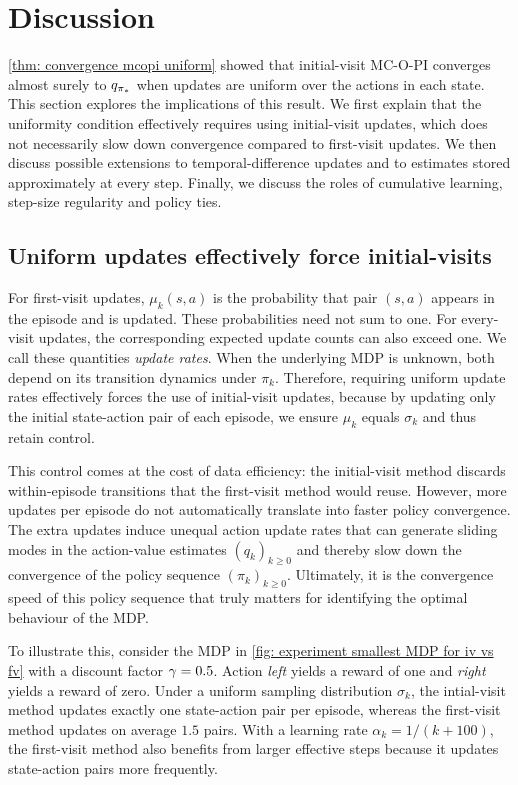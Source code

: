 %
\section{Discussion}
\label{sec: discussion}

\autoref{thm: convergence mcopi uniform} showed that initial-visit MC-O-PI converges almost surely to $q_{{\pi}_*}$ 
%
when updates are uniform over the actions in each state.
%
%
%
%
%
%
%
%
This section explores the implications of this result.
We first explain that the uniformity condition effectively requires using initial-visit updates, which does not necessarily slow down convergence compared to first-visit updates.
We then discuss possible extensions to temporal-difference updates and to estimates stored approximately at every step.
Finally, we discuss the roles of cumulative learning, step-size regularity and policy ties.


%
%


%
%
\subsection{Uniform updates effectively force initial-visits}


For first-visit updates, $\mu_k(s,a)$ is the probability that pair $(s,a)$ appears in the episode and is updated. These probabilities need not sum to one. For every-visit updates, the corresponding expected update counts can also exceed one. We call these quantities \emph{update rates}. When the underlying MDP is unknown, both depend on its transition dynamics under $\pi_k$.
Therefore, requiring uniform update rates effectively forces the use of initial-visit updates,
%
because by updating only the initial state-action pair of each episode, we ensure $\mu_k$ equals $\sigma_k$ and thus retain control.

This control comes at the cost of data efficiency: the initial-visit method discards within-episode transitions that the first-visit method would reuse. However, more updates per episode do not automatically translate into faster policy convergence.
The extra updates induce unequal action update rates that can generate sliding modes in the action-value estimates $(q_k)_{k \ge 0}$ and thereby slow down the convergence of the policy sequence $(\pi_k)_{k \ge 0}$. Ultimately, it is the convergence speed of this policy sequence that truly matters for identifying the optimal behaviour of the MDP.

%
To illustrate this, consider the MDP in \autoref{fig: experiment smallest MDP for iv vs fv} with a discount factor $\gamma = 0.5$. Action \textit{left} yields a reward of one and \textit{right} yields a reward of zero.
%
%
Under a uniform sampling distribution $\sigma_k$, the intial-visit method updates exactly one state-action pair per episode, whereas the first-visit method updates on average $1.5$ pairs.
With a learning rate $\alpha_k = 1/(k+100)$, the first-visit method also benefits from larger effective steps because it updates state-action pairs more frequently.
%


